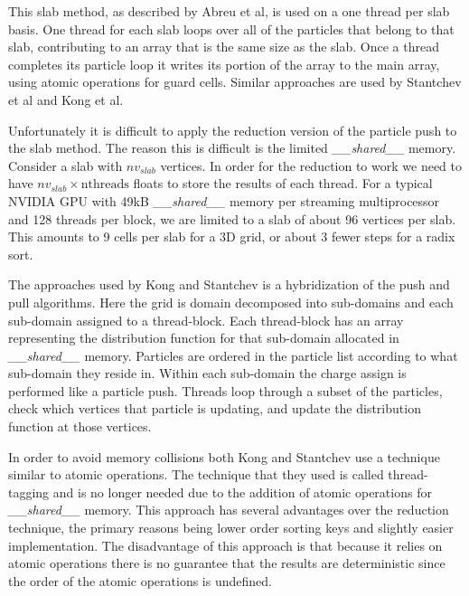 This slab method, as described by Abreu et al, is used on a one thread per slab basis. One thread for each slab loops over all of the particles that belong to that slab, contributing to an array that is the same size as the slab. Once a thread completes its particle loop it writes its portion of the array to the main array, using atomic operations for guard cells.\cite{Abreu2011} Similar approaches are used by Stantchev et al and Kong et al.\cite{Stantchev2008}\cite{Kong2011}

Unfortunately it is difficult to apply the reduction version of the particle push to the slab method. The reason this is difficult is the limited \emph{\_\_shared\_\_} memory. Consider a slab with $nv_{slab}$ vertices. In order for the reduction to work we need to have $nv_{slab} \times \mathrm{nthreads}$ floats to store the results of each thread. For a typical NVIDIA GPU with 49kB \emph{\_\_shared\_\_} memory per streaming multiprocessor and 128 threads per block, we are limited to a slab of about 96 vertices per slab. This amounts to 9 cells per slab for a 3D grid, or about 3 fewer steps for a radix sort.

The approaches used by Kong and Stantchev is a hybridization of the push and pull algorithms. Here the grid is domain decomposed into sub-domains and each sub-domain assigned to a thread-block. Each thread-block has an array representing the distribution function for that sub-domain allocated in \emph{\_\_shared\_\_} memory. Particles are ordered in the particle list according to what sub-domain they reside in. Within each sub-domain the charge assign is performed like a particle push. Threads loop through a subset of the particles, check which vertices that particle is updating, and update the distribution function at those vertices. 

In order to avoid memory collisions both Kong and Stantchev use a technique similar to atomic operations. The technique that they used is called thread-tagging and is no longer needed due to the addition of atomic operations for \emph{\_\_shared\_\_} memory.\cite{Stantchev2008}\cite{Kong2011} This approach has several advantages over the reduction technique, the primary reasons being lower order sorting keys and slightly easier implementation. The disadvantage of this approach is that because it relies on atomic operations there is no guarantee that the results are deterministic since the order of the atomic operations is undefined. 







